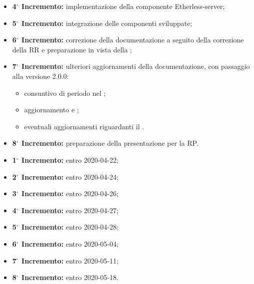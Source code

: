 \begin{itemize}
\begin{longtable}{
						>{\centering}p{}
						>{\centering}p{} }
					\end{longtable}
				\item \textbf{4$^{\circ}$ Incremento:} implementazione della componente Etherless-server;
				\item \textbf{5$^{\circ}$ Incremento:} integrazione delle componenti sviluppate;
				\item \textbf{6$^{\circ}$ Incremento:} correzione della documentazione a seguito della correzione della RR e preparazione in vista della \TB{};
				\item \textbf{7$^{\circ}$ Incremento:} ulteriori aggiornamenti della documentazione, con passaggio alla versione 2.0.0:
				\begin{itemize}
					\item consuntivo di periodo nel \PdP{};
					\item aggiornamento \NdP{} e \PdQ{};
					\item eventuali aggiornamenti riguardanti il \Glossario{}.
				\end{itemize}
				\item \textbf{8$^{\circ}$ Incremento:} preparazione della presentazione per la RP.
			\end{itemize}
			\begin{itemize}
				\item \textbf{1$^{\circ}$ Incremento:} entro 2020-04-22;
				\item \textbf{2$^{\circ}$ Incremento:} entro 2020-04-24;
				\item \textbf{3$^{\circ}$ Incremento:} entro 2020-04-26;
				\item \textbf{4$^{\circ}$ Incremento:} entro 2020-04-27;
				\item \textbf{5$^{\circ}$ Incremento:} entro 2020-04-28; %
				\item \textbf{6$^{\circ}$ Incremento:} entro 2020-05-04;
				\item \textbf{7$^{\circ}$ Incremento:} entro 2020-05-11;
				\item \textbf{8$^{\circ}$ Incremento:} entro 2020-05-18.
			\end{itemize}

